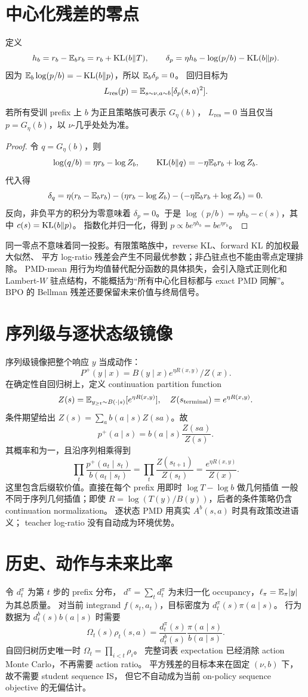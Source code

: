 \section{中心化残差的零点}
定义
\[
 h_b=r_b-\mathbb{E}_b r_b=r_b+\operatorname{KL}(b\Vert T),\qquad
 \delta_p=\eta h_b-\log(p/b)-\operatorname{KL}(b\Vert p).
\]
因为 $\mathbb{E}_b\log(p/b)=-\operatorname{KL}(b\Vert p)$，所以 $\mathbb{E}_b\delta_p=0$。
回归目标为
\[
 L_{\mathrm{res}}(p)=\mathbb{E}_{s\sim\nu,a\sim b}[\delta_p(s,a)^2].
\]
\begin{theorem}[残差与镜像目标的等价零点]\label{thm:residual}
若所有受训 prefix 上 $b$ 为正且策略族可表示 $G_\eta(b)$，
$L_{\mathrm{res}}=0$ 当且仅当 $p=G_\eta(b)$，以 $\nu$-几乎处处为准。
\end{theorem}
\begin{proof}
令 $q=G_\eta(b)$，则
\[
 \log(q/b)=\eta r_b-\log Z_b,\qquad
 \operatorname{KL}(b\Vert q)=-\eta\mathbb{E}_b r_b+\log Z_b.
\]
代入得
\[
 \delta_q=\eta(r_b-\mathbb{E}_b r_b)-(\eta r_b-\log Z_b)
          -(-\eta\mathbb{E}_b r_b+\log Z_b)=0.
\]
反向，非负平方的积分为零意味着 $\delta_p=0$。于是
$\log(p/b)=\eta h_b-c(s)$，其中 $c(s)=\operatorname{KL}(b\Vert p)$。
指数化并归一化，得到 $p\propto b e^{\eta h_b}=b e^{\eta r_b}$。
\end{proof}
同一零点不意味着同一投影。有限策略族中，reverse KL、forward KL 的加权最大似然、
平方 log-ratio 残差会产生不同最优参数；非凸驻点也不能由零点定理排除。
PMD-mean 用行为均值替代配分函数的具体损失，会引入隐式正则化和
Lambert-$W$ 驻点结构，不能概括为“所有中心化目标都与 exact PMD 同解”。
BPO 的 Bellman 残差还要保留未来价值与终局信号。

\section{序列级与逐状态级镜像}
序列级镜像把整个响应 $y$ 当成动作：
\[
 P^+(y\mid x)=B(y\mid x)e^{\eta R(x,y)}/Z(x).
\]
在确定性自回归树上，定义 continuation partition function
\[
 Z(s)=\mathbb{E}_{y_{\ge t}\sim B(\cdot\mid s)}[e^{\eta R(x,y)}],
 \quad Z(s_{\mathrm{terminal}})=e^{\eta R(x,y)}.
\]
条件期望给出 $Z(s)=\sum_a b(a\mid s)Z(sa)$。故
\[
 p^+(a\mid s)=b(a\mid s)\frac{Z(sa)}{Z(s)}.
\]
其概率和为一，且沿序列相乘得到
\[
 \prod_t\frac{p^+(a_t\mid s_t)}{b(a_t\mid s_t)}
 =\prod_t\frac{Z(s_{t+1})}{Z(s_t)}
 =\frac{e^{\eta R(x,y)}}{Z(x)}.
\]
这里包含后缀软价值。直接在每个 prefix 用即时 $\log T-\log b$ 做几何插值
一般不同于序列几何插值；即使 $R=\log(T(y)/B(y))$，后者的条件策略仍含
continuation normalization。
逐状态 PMD 用真实 $A^b(s,a)$ 时具有政策改进语义；
teacher log-ratio 没有自动成为环境优势。

\section{历史、动作与未来比率}
令 $d^\pi_t$ 为第 $t$ 步的 prefix 分布，
$d^\pi=\sum_t d^\pi_t$ 为未归一化 occupancy，$\ell_\pi=\mathbb{E}_\pi|y|$ 为其总质量。
对当前 integrand $f(s_t,a_t)$，目标密度为 $d^\pi_t(s)\pi(a\mid s)$。
行为数据为 $d^b_t(s)b(a\mid s)$ 时需要
\[
 \Omega_t(s)\rho_t(s,a)=\frac{d^\pi_t(s)}{d^b_t(s)}
                       \frac{\pi(a\mid s)}{b(a\mid s)}.
\]
自回归树历史唯一时 $\Omega_t=\prod_{i<t}\rho_i$。
完整词表 expectation 已经消除 action Monte Carlo，不再需要 action ratio。
平方残差的目标本来在固定 $(\nu,b)$ 下，故不需要 student sequence IS，
但它不自动成为当前 on-policy sequence objective 的无偏估计。

